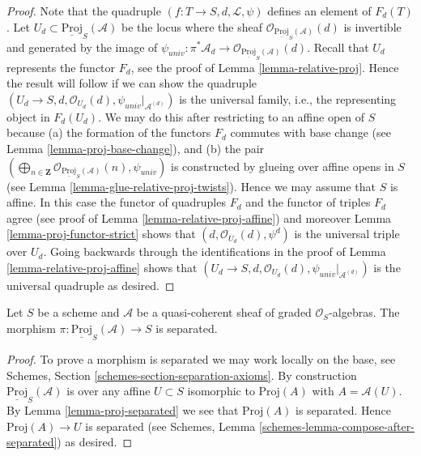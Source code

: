 \begin{proof}
Note that the quadruple $(f : T \to S, d, \mathcal{L}, \psi)$
defines an element of $F_d(T)$. Let
$U_d \subset \underline{\text{Proj}}_S(\mathcal{A})$
be the locus
where the sheaf $\mathcal{O}_{\underline{\text{Proj}}_S(\mathcal{A})}(d)$
is invertible and generated by the image of
$\psi_{univ} : \pi^*\mathcal{A}_d \to
\mathcal{O}_{\underline{\text{Proj}}_S(\mathcal{A})}(d)$.
Recall that $U_d$ represents the functor $F_d$, see the proof
of Lemma \ref{lemma-relative-proj}. Hence the result will follow
if we can show the quadruple
$(U_d \to S, d, \mathcal{O}_{U_d}(d), \psi_{univ}|_{\mathcal{A}^{(d)}})$
is the universal family, i.e., the representing object in $F_d(U_d)$.
We may do this after restricting to an affine open of $S$ because
(a) the formation of the functors $F_d$ commutes with base change
(see Lemma \ref{lemma-proj-base-change}), and (b) the pair
$(\bigoplus_{n \in \mathbf{Z}}
\mathcal{O}_{\underline{\text{Proj}}_S(\mathcal{A})}(n),
\psi_{univ})$
is constructed by glueing over affine opens in $S$
(see Lemma \ref{lemma-glue-relative-proj-twists}).
Hence we may assume that $S$ is affine. In this case the functor
of quadruples $F_d$ and the functor of triples $F_d$ agree
(see proof of Lemma \ref{lemma-relative-proj-affine}) and moreover
Lemma \ref{lemma-proj-functor-strict}
shows that $(d, \mathcal{O}_{U_d}(d), \psi^d)$
is the universal triple over $U_d$.
Going backwards through the identifications in the proof of
Lemma \ref{lemma-relative-proj-affine} shows that
$(U_d \to S, d, \mathcal{O}_{U_d}(d), \psi_{univ}|_{\mathcal{A}^{(d)}})$
is the universal quadruple as desired.
\end{proof}

\begin{lemma}
\label{lemma-relative-proj-separated}
Let $S$ be a scheme and $\mathcal{A}$ be a quasi-coherent sheaf
of graded $\mathcal{O}_S$-algebras. The morphism
$\pi : \underline{\text{Proj}}_S(\mathcal{A}) \to S$
is separated.
\end{lemma}

\begin{proof}
To prove a morphism is separated we may work locally on the base,
see Schemes, Section \ref{schemes-section-separation-axioms}.
By construction $\underline{\text{Proj}}_S(\mathcal{A})$ is
over any affine $U \subset S$ isomorphic to
$\text{Proj}(A)$ with $A = \mathcal{A}(U)$. By
Lemma \ref{lemma-proj-separated} we see that $\text{Proj}(A)$ is separated.
Hence $\text{Proj}(A) \to U$ is separated (see
Schemes, Lemma \ref{schemes-lemma-compose-after-separated}) as desired.
\end{proof}

